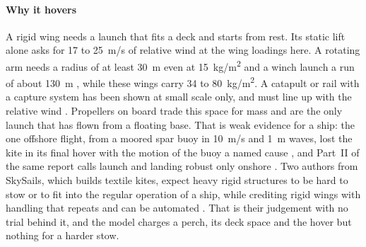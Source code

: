 \paragraph{Why it hovers} A rigid wing needs a launch that fits a deck and starts from rest. Its static lift alone asks for 17 to \SI{25}{m/s} of relative wind at the wing loadings here. A rotating arm needs a radius of at least \SI{30}{m} even at \SI{15}{kg/m^2} and a winch launch a run of about \SI{130}{m} \citep{fagiano2017takeoff}, while these wings carry 34 to \SI{80}{kg/m^2}. A catapult or rail with a capture system has been shown at small scale only, and must line up with the relative wind \citep{joshi2025}. Propellers on board trade this space for mass and are the only launch that has flown from a floating base. That is weak evidence for a ship: the one offshore flight, from a moored spar buoy in \SI{10}{m/s} and \SI{1}{m} waves, lost the kite in its final hover with the motion of the buoy a named cause \citep{echeverri2020part1}, and Part~II of the same report calls launch and landing robust only onshore \citep{echeverri2020part2}. Two authors from SkySails, which builds textile kites, expect heavy rigid structures to be hard to stow or to fit into the regular operation of a ship, while crediting rigid wings with handling that repeats and can be automated \citep{paulig2013}. That is their judgement with no trial behind it, and the model charges a perch, its deck space and the hover but nothing for a harder stow.

